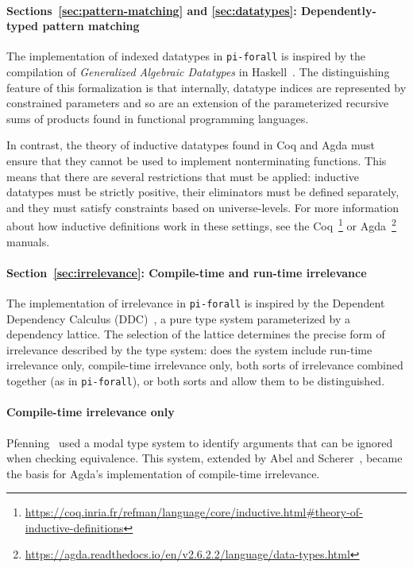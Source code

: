 \documentclass{article}
\newcommand\pif{\texttt{pi-forall}\xspace}
\theoremstyle{definition}
\begin{document}
\paragraph{Sections~\ref{sec:pattern-matching} and \ref{sec:datatypes}: Dependently-typed pattern matching}

The implementation of indexed datatypes in \pif is inspired by the compilation
of \emph{Generalized Algebraic Datatypes} in
Haskell~\cite{vytiniotis2011outsidein,vytiniotis2006simple}. The
distinguishing feature of this formalization is that internally, datatype
indices are represented by constrained parameters and so are an extension of
the parameterized recursive sums of products found in functional programming
languages.

In contrast, the theory of inductive datatypes found in Coq and Agda must
ensure that they cannot be used to implement nonterminating functions. This
means that there are several restrictions that must be applied: inductive
datatypes must be strictly positive, their eliminators must be defined
separately, and they must satisfy constraints based on universe-levels.  For
more information about how inductive definitions work in these settings, see
the
Coq~\footnote{\url{https://coq.inria.fr/refman/language/core/inductive.html#theory-of-inductive-definitions}}
or
Agda~\footnote{\url{https://agda.readthedocs.io/en/v2.6.2.2/language/data-types.html}}
manuals.

\paragraph{Section~\ref{sec:irrelevance}: Compile-time and run-time irrelevance}

The implementation of irrelevance in \pif is inspired by the Dependent
Dependency Calculus (DDC)~\cite{choudhury:ddc}, a pure type system
parameterized by a dependency lattice. The selection of the lattice determines
the precise form of irrelevance described by the type system: does the system
include run-time irrelevance only, compile-time irrelevance only, both sorts
of irrelevance combined together (as in \pif), or both sorts and allow them to
be distinguished.

\paragraph{Compile-time irrelevance only}

Pfenning~\cite{pfenning:2001} used a modal type system to identify arguments
that can be ignored when checking equivalence. This system, extended by Abel
and Scherer~\cite{abel-scherer}, became the basis for Agda's implementation of
compile-time irrelevance.
\end{document}
